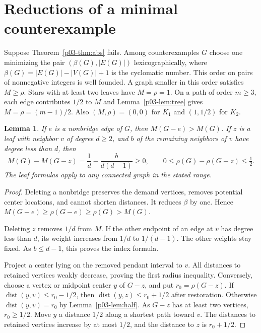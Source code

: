 \documentclass[11pt,a4paper]{article}
\newtheorem{lemma}[theorem]{Lemma}\newtheorem{corollary}[theorem]{Corollary}
\newcommand{\dist}{\operatorname{dist}}\newcommand{\ecc}{\operatorname{ecc}}
\begin{document}
\section{Reductions of a minimal counterexample}\label{p03-sec:red}
Suppose Theorem~\ref{p03-thm:abs} fails. Among counterexamples $G$ choose
one minimizing the pair $(\beta(G),|E(G)|)$ lexicographically, where
$\beta(G)=|E(G)|-|V(G)|+1$ is the cyclomatic number. This order on
pairs of nonnegative integers is well founded. A graph smaller in this
order satisfies $M\ge\rho$. Stars with at least two leaves have
$M=\rho=1$. On a path of order $m\ge3$, each edge contributes $1/2$
to $M$ and Lemma~\ref{p03-lem:tree} gives $M=\rho=(m-1)/2$. Also
$(M,\rho)=(0,0)$ for $K_1$ and $(1,1/2)$ for $K_2$.

\begin{lemma}\label{p03-lem:delete}
If $e$ is a nonbridge edge of $G$, then $M(G-e)>M(G)$. If $z$ is
a leaf with neighbor $v$ of degree $d\ge2$, and $b$ of the remaining
neighbors of $v$ have degree less than $d$, then
\begin{equation}\label{p03-eq:oneleaf}
 M(G)-M(G-z)=\frac1d-\frac{b}{d(d-1)}\ge0,\qquad
 0\le\rho(G)-\rho(G-z)\le\tfrac12.
\end{equation}
The leaf formulas apply to any connected graph in the stated range.
\end{lemma}
\begin{proof}
Deleting a nonbridge preserves the demand vertices, removes potential
center locations, and cannot shorten distances. It reduces $\beta$ by
one. Hence $M(G-e)\ge\rho(G-e)\ge\rho(G)>M(G)$.

Deleting $z$ removes $1/d$ from $M$. If the other endpoint of an edge
at $v$ has degree less than $d$, its weight increases from $1/d$ to
$1/(d-1)$. The other weights stay fixed. As $b\le d-1$, this proves
the index formula.

Project a center lying on the removed pendant interval to $v$. All
distances to retained vertices weakly decrease, proving the first
radius inequality. Conversely, choose a vertex or midpoint center $y$
of $G-z$, and put $r_0=\rho(G-z)$. If $\dist(y,v)\le r_0-1/2$,
then $\dist(y,z)\le r_0+1/2$ after restoration. Otherwise
$\dist(y,v)=r_0$ by Lemma~\ref{p03-lem:half}. As $G-z$ has at least two
vertices, $r_0\ge1/2$. Move $y$ a distance $1/2$ along a shortest
path toward $v$. The distances to retained vertices increase by at
most $1/2$, and the distance to $z$ is $r_0+1/2$.
\end{proof}
\end{document}
